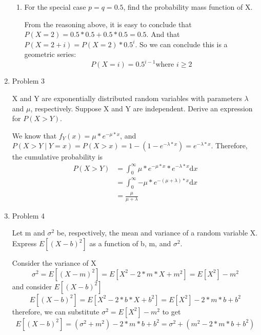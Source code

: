 \documentclass[letterpaper]{article}
\begin{document}
\begin{enumerate}
\begin{enumerate}
\item{}  For the special case $p = q = 0.5$, find the probability mass function of X.

From the reasoning above, it is easy to conclude that $P(X = 2) = 0.5 * 0.5 + 0.5 * 0.5 = 0.5$. And that $P(X = 2 + i) = P(X = 2) * 0.5 ^ i$. So we can conclude this is a geometric series:
\begin{equation}
P(X = i) = 0.5^{i-1} \text{where $i \ge 2$}
\end{equation}


\end{enumerate}
\medskip
\newpage

\item{Problem 3}
\begin{mdframed}
X and Y are exponentially distributed random variables with parameters $\lambda$ and $\mu$, respectively. Suppose X and Y are independent. Derive an expression for $P(X > Y)$.
\end{mdframed}

We know that $f_Y(x) = \mu * e^{-\mu*x}$, and $P(X > Y \mid Y = x) = P(X > x) = 1 - (1 - e^{-\lambda * x}) = e^{-\lambda * x}$. Therefore, the cumulative probability is
\begin{equation}
\begin{split}
P(X > Y) &= \int_{0}^{\infty}{\mu * e^{-\mu*x} * e^{-\lambda * x}} \mathrm{d}x\\
              &= \int_{0}^{\infty}{- \mu * e^{- (\mu + \lambda) * x}} \mathrm{d}x\\
              &= \frac{\mu}{\mu + \lambda}
\end{split}
\end{equation}
\medskip

\item{Problem 4}
\begin{mdframed}
Let m and $\sigma^2$ be, respectively, the mean and variance of a random variable X. Express $E[(X - b)^2]$ as a function of b, m, and $\sigma^2$.
\end{mdframed}

Consider the variance of X
\begin{equation}
\sigma^2 = E[(X-m)^2] = E[X^2 - 2*m*X + m^2] = E[X^2] - m^2
\end{equation}
and consider $E[(X - b)^2]$
\begin{equation}
E[(X - b)^2] = E[X^2 - 2*b*X + b^2] = E[X^2] - 2*m*b + b^2
\end{equation}
therefore, we can substitute $\sigma^2 = E[X^2] - m^2$ to get
\begin{equation}
E[(X - b)^2] = (\sigma^2 + m^2) - 2*m*b + b^2 = \sigma^2 + (m^2 - 2*m*b + b^2)
\end{equation}


\end{enumerate}
\end{document}
